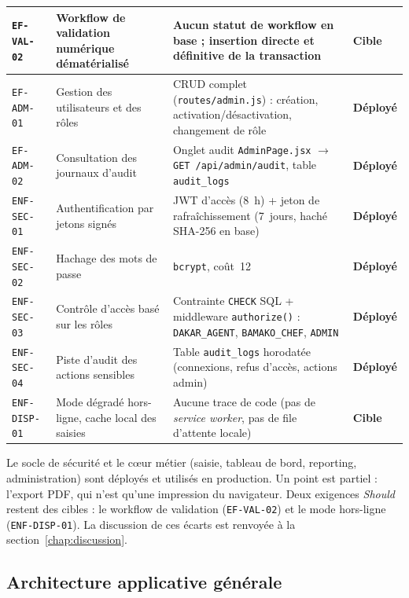 \begin{table}[htbp]
\begin{tabularx}{\linewidth}{|>{\raggedright\arraybackslash}p{2.0cm}|>{\raggedright\arraybackslash}p{3.1cm}|>{\raggedright\arraybackslash}X|>{\raggedright\arraybackslash}p{1.5cm}|}
\texttt{EF-VAL-02} & Workflow de validation numérique dématérialisé & Aucun statut de workflow en base ; insertion directe et définitive de la transaction & \textbf{Cible} \\ \hline
\texttt{EF-ADM-01} & Gestion des utilisateurs et des rôles & CRUD complet (\texttt{routes/admin.js}) : création, activation/désactivation, changement de rôle & \textbf{Déployé} \\ \hline
\texttt{EF-ADM-02} & Consultation des journaux d'audit & Onglet audit \texttt{AdminPage.jsx} $\rightarrow$ \texttt{GET /api/admin/audit}, table \texttt{audit\_logs} & \textbf{Déployé} \\ \hline
\texttt{ENF-SEC-01} & Authentification par jetons signés & JWT d'accès (8~h) + jeton de rafraîchissement (7~jours, haché SHA-256 en base) & \textbf{Déployé} \\ \hline
\texttt{ENF-SEC-02} & Hachage des mots de passe & \texttt{bcrypt}, coût~12 & \textbf{Déployé} \\ \hline
\texttt{ENF-SEC-03} & Contrôle d'accès basé sur les rôles & Contrainte \texttt{CHECK} SQL + middleware \texttt{authorize()} : \texttt{DAKAR\_AGENT}, \texttt{BAMAKO\_CHEF}, \texttt{ADMIN} & \textbf{Déployé} \\ \hline
\texttt{ENF-SEC-04} & Piste d'audit des actions sensibles & Table \texttt{audit\_logs} horodatée (connexions, refus d'accès, actions admin) & \textbf{Déployé} \\ \hline
\texttt{ENF-DISP-01} & Mode dégradé hors-ligne, cache local des saisies & Aucune trace de code (pas de \textit{service worker}, pas de file d'attente locale) & \textbf{Cible} \\ \hline
\end{tabularx}
\end{table}

Le socle de sécurité et le cœur métier (saisie, tableau de bord, reporting, administration) sont déployés et utilisés en production. Un point est partiel : l'export PDF, qui n'est qu'une impression du navigateur. Deux exigences \textit{Should} restent des cibles : le workflow de validation (\texttt{EF-VAL-02}) et le mode hors-ligne (\texttt{ENF-DISP-01}). La discussion de ces écarts est renvoyée à la section~\ref{chap:discussion}.

\subsection{Architecture applicative générale}
\label{sec:webapp_architecture}

